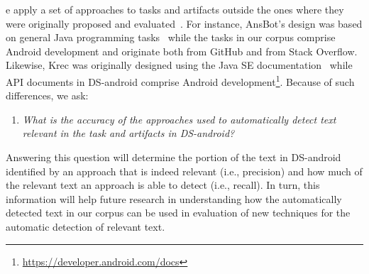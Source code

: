 
\vspace{3mm}



\vspace{3mm}
e apply a set of approaches 
to tasks and artifacts outside the ones where they were originally proposed and evaluated~\cite{nadi2020, Robillard2015, Lotufo2012, Xu2017}.
For instance, \acs{AnsBot}'s design was based on general Java programming tasks~\cite{Xu2017} while the tasks in our corpus comprise Android development and originate both from GitHub and from Stack Overflow. 
Likewise, \acs{Krec} was originally designed using the Java SE documentation~\cite{Robillard2015} 
while API documents in \acs{DS-android} comprise Android development\footnote{\url{https://developer.android.com/docs}}.
Because of such differences, we ask:


\begin{enumerate}[label={},leftmargin=0.7cm]
\item \textit{What is the accuracy of the approaches used to automatically detect text relevant in the task and artifacts in \acs{DS-android}?} 

\end{enumerate}


Answering this question will determine the portion of the text in \acs{DS-android} identified by an approach that 
is indeed relevant (i.e., precision) and how much 
of the relevant text an approach is able to detect (i.e., recall).
In turn, this information will help future research in understanding
how the automatically detected text in our corpus can be used in evaluation of new techniques for the automatic detection of relevant text. 













